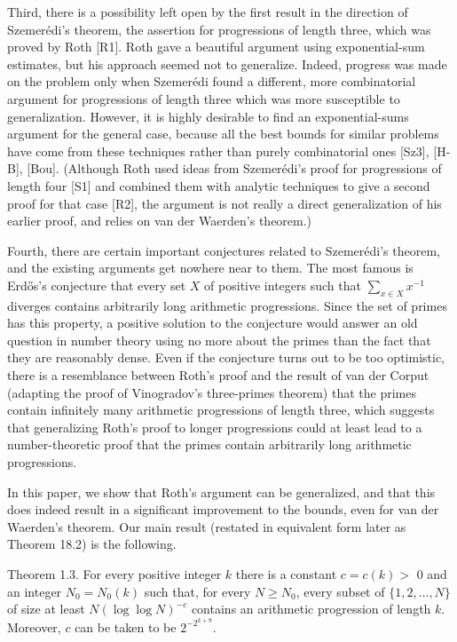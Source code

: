 \documentclass[10pt]{article}
\begin{document}
Third, there is a possibility left open by the first result in the direction of Szemerédi's theorem, the assertion for progressions of length three, which was proved by Roth [R1]. Roth gave a beautiful argument using exponential-sum estimates, but his approach seemed not to generalize. Indeed, progress was made on the problem only when Szemerédi found a different, more combinatorial argument for progressions of length three which was more susceptible to generalization. However, it is highly desirable to find an exponential-sums argument for the general case, because all the best bounds for similar problems have come from these techniques rather than purely combinatorial ones [Sz3], [H-B], [Bou]. (Although Roth used ideas from Szemerédi's proof for progressions of length four [S1] and combined them with analytic techniques to give a second proof for that case [R2], the argument is not really a direct generalization of his earlier proof, and relies on van der Waerden's theorem.)

Fourth, there are certain important conjectures related to Szemerédi's theorem, and the existing arguments get nowhere near to them. The most famous is Erdős's conjecture that every set $X$ of positive integers such that $\sum_{x \in X} x^{-1}$ diverges contains arbitrarily long arithmetic progressions. Since the set of primes has this property, a positive solution to the conjecture would answer an old question in number theory using no more about the primes than the fact that they are reasonably dense. Even if the conjecture turns out to be too optimistic, there is a resemblance between Roth's proof and the result of van der Corput (adapting the proof of Vinogradov's three-primes theorem) that the primes contain infinitely many arithmetic progressions of length three, which suggests that generalizing Roth's proof to longer progressions could at least lead to a number-theoretic proof that the primes contain arbitrarily long arithmetic progressions.

In this paper, we show that Roth's argument can be generalized, and that this does indeed result in a significant improvement to the bounds, even for van der Waerden's theorem. Our main result (restated in equivalent form later as Theorem 18.2) is the following.

Theorem 1.3. For every positive integer $k$ there is a constant $c=c(k)>$ 0 and an integer $N_0=N_0(k)$ such that, for every $N\geqslant N_0$, every subset of $\{1,2, \ldots, N\}$ of size at least $N(\log \log N)^{-c}$ contains an arithmetic progression of length $k$. Moreover, $c$ can be taken to be $2^{-2^{k+9}}$.
\end{document}
